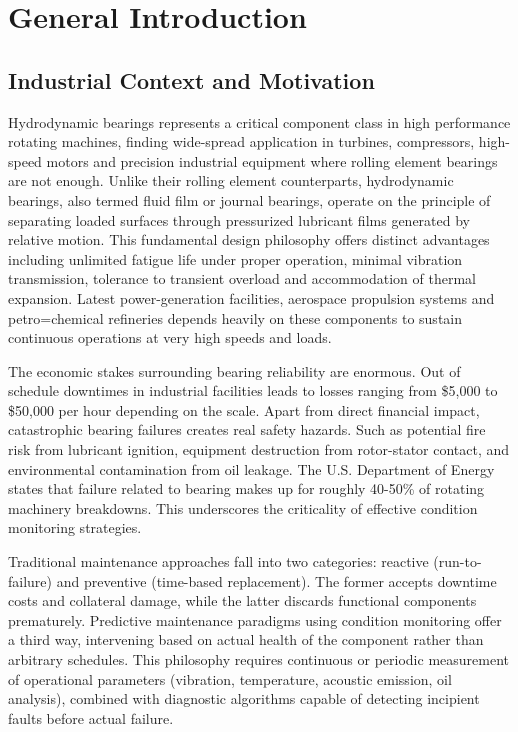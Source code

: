 \documentclass[11pt,a4paper]{article}
\begin{document}
\newpage

\section{General Introduction}

\subsection{Industrial Context and Motivation}

Hydrodynamic bearings represents a critical component class in high performance rotating machines, finding wide-spread application in turbines, compressors, high-speed motors and precision industrial equipment where rolling element bearings are not enough. Unlike their rolling element counterparts, hydrodynamic bearings, also termed fluid film or journal bearings, operate on the principle of separating loaded surfaces through pressurized lubricant films generated by relative motion. This fundamental design philosophy offers distinct advantages including  unlimited fatigue life under proper operation, minimal vibration transmission, tolerance to transient overload and accommodation of thermal expansion. Latest power-generation facilities, aerospace propulsion systems and petro=chemical refineries  depends heavily on these components to sustain continuous operations at very high speeds and loads.

The economic stakes surrounding bearing reliability are enormous. Out of schedule downtimes in industrial facilities leads to losses ranging from \$5,000 to \$50,000 per hour depending on the scale. Apart from direct financial impact, catastrophic bearing failures creates real safety hazards. Such as potential fire risk from lubricant ignition, equipment destruction from rotor-stator contact, and environmental contamination from oil leakage. The U.S. Department of Energy states that failure related to bearing makes up for roughly 40-50\% of rotating machinery breakdowns. This underscores the criticality of effective condition monitoring strategies.

Traditional maintenance approaches fall into two categories: reactive (run-to-failure) and preventive (time-based replacement). The former accepts downtime costs and collateral damage, while the latter discards functional components prematurely. Predictive maintenance paradigms using condition monitoring offer a third way, intervening based on  actual health of the component  rather than arbitrary schedules. This philosophy requires continuous or periodic measurement of operational parameters (vibration, temperature, acoustic emission, oil analysis),  combined with diagnostic algorithms capable of detecting incipient faults before actual failure.
\end{document}
